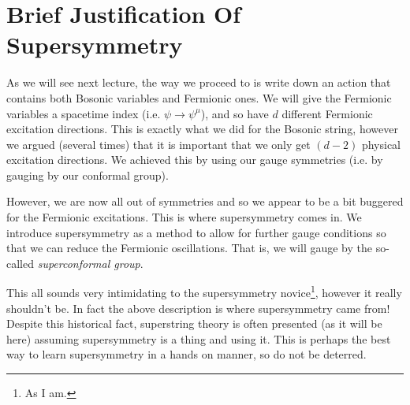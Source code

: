 \section{Brief Justification Of Supersymmetry}

As we will see next lecture, the way we proceed to is write down an action that contains both Bosonic variables and Fermionic ones. We will give the Fermionic variables a spacetime index (i.e. $\psi\to\psi^{\mu}$), and so have $d$ different Fermionic excitation directions. This is exactly what we did for the Bosonic string, however we argued (several times) that it is important that we only get $(d-2)$ physical excitation directions. We achieved this by using our gauge symmetries (i.e. by gauging by our conformal group). 

However, we are now all out of symmetries and so we appear to be a bit buggered for the Fermionic excitations. This is where supersymmetry comes in. We introduce supersymmetry as a method to allow for further gauge conditions so that we can reduce the Fermionic oscillations. That is, we will gauge by the so-called \textit{superconformal group}.

This all sounds very intimidating to the supersymmetry novice\footnote{As I am.}, however it really shouldn't be. In fact the above description is where supersymmetry came from! Despite this historical fact, superstring theory is often presented (as it will be here) assuming supersymmetry is a thing and using it. This is perhaps the best way to learn supersymmetry in a hands on manner, so do not be deterred. 